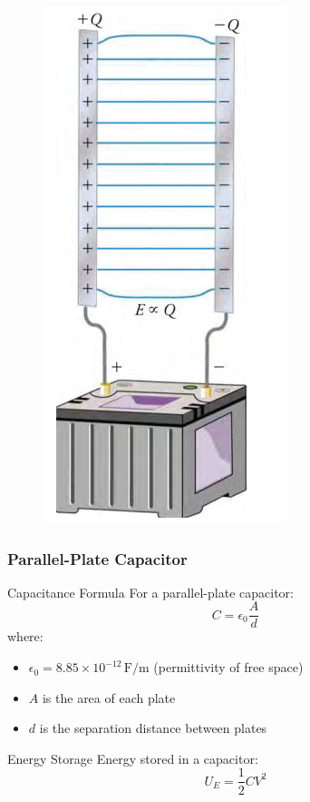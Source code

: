\documentclass{beamer}
\begin{document}
\begin{frame}
    
       \begin{figure}
           \centering
           \includegraphics[width=0.25\linewidth]{phys11-electrostatics-parallel-plate-capacitor-diagram.png}
       \end{figure}
    
\end{frame}

\begin{frame}
    \frametitle{Parallel-Plate Capacitor}
    \begin{block}{Capacitance Formula}
        For a parallel-plate capacitor:
        \begin{equation}
            C = \epsilon_0 \frac{A}{d}
        \end{equation}
        where:
        \begin{itemize}
            \item $\epsilon_0 = 8.85 \times 10^{-12} \, \text{F/m}$ (permittivity of free space)
            \item $A$ is the area of each plate
            \item $d$ is the separation distance between plates
        \end{itemize}
    \end{block}
    
    \begin{block}{Energy Storage}
        Energy stored in a capacitor:
        \begin{equation}
            U_E = \frac{1}{2}CV^2
        \end{equation}
    \end{block}
\end{frame}
\end{document}
